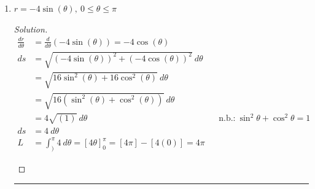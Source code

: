 \documentclass[12pt]{article}
\begin{document}
		\begin{enumerate}
			\item[1.] \(\displaystyle r = -4\sin \left(\theta\right),~0\leq \theta \leq \pi\)
			
			\begin{proof}[Solution]
				\begin{align*}
					\frac{dr}{d\theta} & = \frac{d}{d\theta} \left(-4\sin\left(\theta\right)\right) = -4\cos\left(\theta\right) \\
					ds & = \sqrt{\left(-4\sin\left(\theta\right)\right)^2+\left(-4\cos\left(\theta\right)\right)^2}~d\theta \\
					& = \sqrt{16\sin^2\left(\theta\right)+16\cos^2\left(\theta\right)}~d\theta \\
					& = \sqrt{16\left(\sin^2\left(\theta\right)+\cos^2\left(\theta\right)\right)}~d\theta \\
					& = 4\sqrt{(1)}~d\theta && \text{n.b.:}~\sin^2\theta+\cos^2\theta = 1 \\
					ds & = 4~d\theta \\
					L & = \int_)^{\pi} 4~d\theta = \left[4\theta\right]_0^{\pi} = \left[4\pi\right]-\left[4(0)\right] = 4\pi
				\end{align*}
				\begin{center}
				\end{center}
			\end{proof}
			\hrule
			

\end{enumerate}
\end{document}
